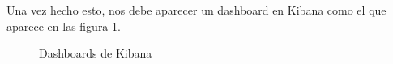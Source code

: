 Una vez hecho esto, nos debe aparecer un dashboard en Kibana como el que aparece en las figura \ref{kibana1}.

\begin{figure}[htp]
\centering
\centering
{}
\caption{Dashboards de Kibana}
\label{kibana1}
\end{figure}



